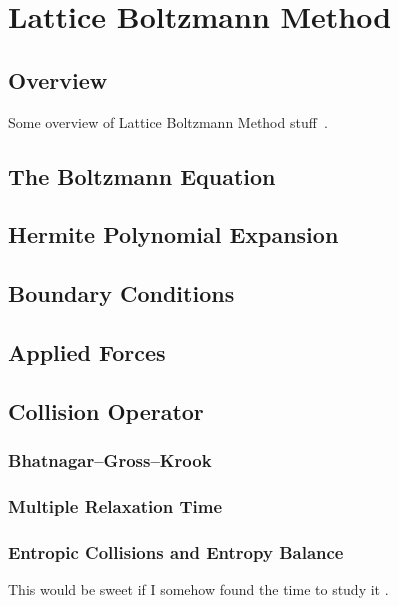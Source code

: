 \documentclass{article}
\begin{document}
\section{Lattice Boltzmann Method}

\subsection{Overview}

Some overview of Lattice Boltzmann Method stuff~\cite{grasinger2015simulation}.

\subsection{The Boltzmann Equation}

\subsection{Hermite Polynomial Expansion}

\subsection{Boundary Conditions}

\subsection{Applied Forces}

\subsection{Collision Operator}

\subsubsection{Bhatnagar--Gross--Krook}

\subsubsection{Multiple Relaxation Time}

\subsubsection{Entropic Collisions and Entropy Balance}

{\color{red} This would be sweet if I somehow found the time to study it \cite{gorban2014enhancement}.}
\end{document}
